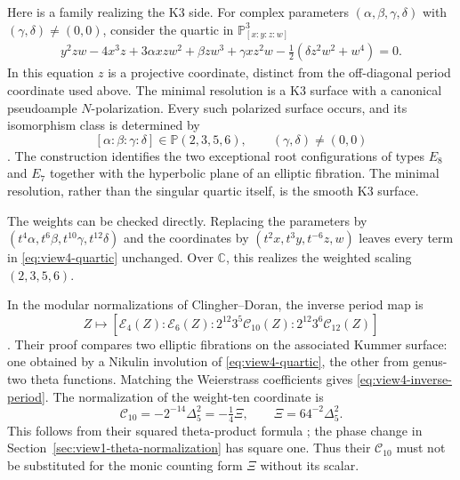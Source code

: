 Here is a family realizing the K3 side. For complex parameters
\((\alpha,\beta,\gamma,\delta)\) with
\((\gamma,\delta)\ne(0,0)\), consider the quartic in
\(\mathbb P^3_{[x:y:z:w]}\)
\begin{equation}\label{eq:view4-quartic}
 \begin{split}
 y^2zw-4x^3z+3\alpha xzw^2+\beta zw^3
   +\gamma xz^2w
   -\tfrac12(\delta z^2w^2+w^4)=0.
 \end{split}
\end{equation}
In this equation \(z\) is a projective coordinate, distinct from the
 off-diagonal period coordinate used above.
The minimal resolution is a K3 surface with a canonical
pseudoample \(N\)-polarization. Every such polarized surface occurs,
and its isomorphism class is determined by
\[
 [\alpha:\beta:\gamma:\delta]\in\mathbb P(2,3,5,6),
 \qquad (\gamma,\delta)\ne(0,0)
\]
\cite[Theorems 1.2 and 1.4]{ClingherDoran2012}.
The construction identifies the two exceptional root configurations
of types \(E_8\) and \(E_7\) together with the hyperbolic plane of
an elliptic fibration. The minimal resolution, rather than the
singular quartic itself, is the smooth K3 surface.

The weights can be checked directly. Replacing the parameters by
\((t^4\alpha,t^6\beta,t^{10}\gamma,t^{12}\delta)\) and the
coordinates by \((t^2x,t^3y,t^{-6}z,w)\) leaves every term in
\eqref{eq:view4-quartic} unchanged. Over \(\mathbb C\), this
realizes the weighted scaling \((2,3,5,6)\).

In the modular normalizations of Clingher--Doran, the inverse period
map is
\begin{equation}\label{eq:view4-inverse-period}
 Z\longmapsto
 [\mathcal E_4(Z):\mathcal E_6(Z):
       2^{12}3^5\mathcal C_{10}(Z):
       2^{12}3^6\mathcal C_{12}(Z)]
\end{equation}
\cite[Theorem 3.5]{ClingherDoran2012}.
Their proof compares two elliptic fibrations on the associated
Kummer surface: one obtained by a Nikulin involution of
\eqref{eq:view4-quartic}, the other from genus-two theta functions.
Matching the Weierstrass coefficients gives
\eqref{eq:view4-inverse-period}.
The normalization of the weight-ten coordinate is
\begin{equation}\label{eq:view4-cd-normalization}
 \mathcal C_{10}=-2^{-14}\Delta_5^2=-\tfrac14\Xi,
 \qquad \Xi=64^{-2}\Delta_5^2.
\end{equation}
This follows from their squared theta-product formula
\cite[(34)]{ClingherDoran2012}; the phase change in
Section~\ref{sec:view1-theta-normalization} has square one.
Thus their \(\mathcal C_{10}\) must not be substituted for the
monic counting form \(\Xi\) without its scalar.

